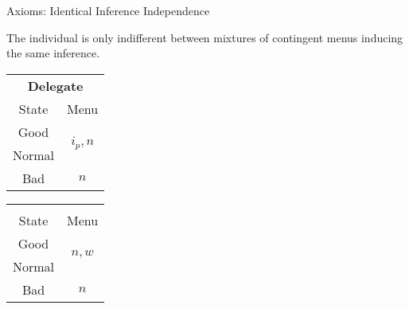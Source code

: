 \documentclass[usenames,dvipsnames,aspectratio=169,11pt, envcountsect, handout]{beamer}
\begin{document}
\begin{frame}{Axioms: Identical Inference Independence}\label{independence}

	\begin{axiom}\label{ax:independence}
		The individual is only indifferent between mixtures of contingent menus inducing the same inference.
	\end{axiom}

	\vfill

	\begin{table}[H]
		\centering
		\begin{minipage}{0.4\textwidth}
			\centering
			\begin{tabular}{c | c}
				\multicolumn{2}{c}{\textbf{Delegate}}                              \\
				State                & Menu                                        \\
				\hline
				{\color{blue}Good}   & \multirow{2}{*}{{\color{blue}\( i_p, n \)}} \\
				{\color{blue}Normal} &                                             \\
				Bad                  & \( n \)                                     \\
			\end{tabular}
			\vspace{0.5cm} %
		\end{minipage}%
		\begin{minipage}{0.4\textwidth}
			\centering
			\begin{tabular}{c | c}
				\multicolumn{2}{c}{}                                             \\
				State                & Menu                                      \\
				\hline
				{\color{blue}Good}   & \multirow{2}{*}{{\color{blue}\( n, w \)}} \\
				{\color{blue}Normal} &                                           \\
				Bad                  & \( n \)                                   \\
			\end{tabular}
			\vspace{0.5cm} %
		\end{minipage} %
	\end{table}

	\begin{flushright}
		\hyperlink{independenceapp}{}
	\end{flushright}

\end{frame}
\end{document}
